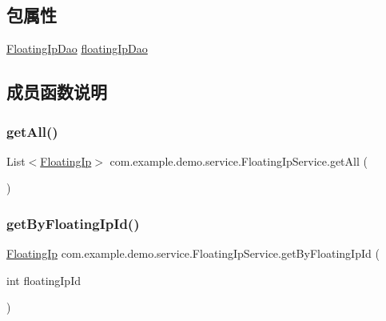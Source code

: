 \subsection*{包属性}
\begin{DoxyCompactItemize}
\item 
\mbox{\hyperlink{interfacecom_1_1example_1_1demo_1_1dao_1_1_floating_ip_dao}{Floating\+Ip\+Dao}} \mbox{\hyperlink{classcom_1_1example_1_1demo_1_1service_1_1_floating_ip_service_ab5766aa725bf523052cf14dcfb4f3e70}{floating\+Ip\+Dao}}
\end{DoxyCompactItemize}


\subsection{成员函数说明}
\mbox{\label{classcom_1_1example_1_1demo_1_1service_1_1_floating_ip_service_a29371c7b264732371b6bf9b6b581aaec}} 
\subsubsection{\texorpdfstring{get\+All()}{getAll()}}
{\footnotesize\ttfamily List$<$\mbox{\hyperlink{classcom_1_1example_1_1demo_1_1modular_1_1_floating_ip}{Floating\+Ip}}$>$ com.\+example.\+demo.\+service.\+Floating\+Ip\+Service.\+get\+All (\begin{DoxyParamCaption}{ }\end{DoxyParamCaption})}

\mbox{\label{classcom_1_1example_1_1demo_1_1service_1_1_floating_ip_service_ab3b01d680415312f816a82b3fbba1e3d}} 
\subsubsection{\texorpdfstring{get\+By\+Floating\+Ip\+Id()}{getByFloatingIpId()}}
{\footnotesize\ttfamily \mbox{\hyperlink{classcom_1_1example_1_1demo_1_1modular_1_1_floating_ip}{Floating\+Ip}} com.\+example.\+demo.\+service.\+Floating\+Ip\+Service.\+get\+By\+Floating\+Ip\+Id (\begin{DoxyParamCaption}\item[{int}]{floating\+Ip\+Id }\end{DoxyParamCaption})}

